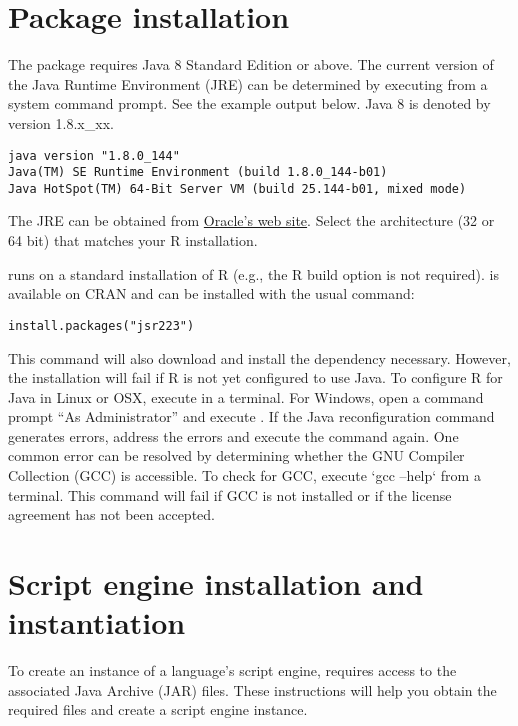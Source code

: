 \section{Package installation}

The  package requires Java 8 Standard Edition or above. The current version of the Java Runtime Environment (JRE) can be determined by executing  from a system command prompt. See the example output below. Java 8 is denoted by version 1.8.x\_xx.

\begin{verbatim}
java version "1.8.0_144"
Java(TM) SE Runtime Environment (build 1.8.0_144-b01)
Java HotSpot(TM) 64-Bit Server VM (build 25.144-b01, mixed mode)
\end{verbatim}

The JRE can be obtained from  \href{http://www.oracle.com/technetwork/java/javase/downloads/jre8-downloads-2133155.html}{Oracle's web site}. Select the architecture (32 or 64 bit) that matches your R installation.

 runs on a standard installation of R (e.g., the R build option  is not required).  is available on CRAN and can be installed with the usual command:

\begin{verbatim}
install.packages("jsr223")
\end{verbatim}
This command will also download and install the  dependency necessary. However, the  installation will fail if R is not yet configured to use Java. To configure R for Java in Linux or OSX, execute  in a terminal. For Windows, open a command prompt “As Administrator” and execute . If the Java reconfiguration command generates errors, address the errors and execute the command again. One common error can be resolved by determining whether the GNU Compiler Collection (GCC) is accessible. To check for GCC, execute `gcc --help` from a terminal. This command will fail if GCC is not installed or if the license agreement has not been accepted.

\hypertarget{scriptengineinstallation}{\section{Script engine installation and instantiation}}

To create an instance of a language's script engine,  requires access to the associated Java Archive (JAR) files. These instructions will help you obtain the required files and create a script engine instance.

